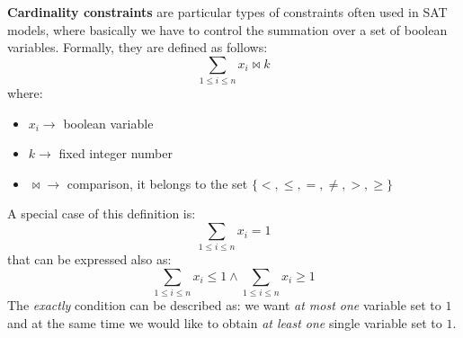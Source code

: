 \textbf{Cardinality constraints} are particular types of constraints often used in SAT models, where basically we have to control the summation over 
a set of boolean variables. Formally, they are defined as follows:
$$\sum_{1 \leq i \leq n} x_i \bowtie k$$
where:
\begin{itemize}
    \renewcommand{\labelitemi}{-}
    \item $x_i \rightarrow$ boolean variable
    \item $k \rightarrow$ fixed integer number
    \item $\bowtie \rightarrow$ comparison, it belongs to the set $\{<, \leq, =, \neq, >, \geq\}$ 
\end{itemize}
A special case of this definition is:
$$\sum_{1 \leq i \leq n} x_i = 1$$
that can be expressed also as:
$$\sum_{1 \leq i \leq n} x_i \leq 1 \wedge \sum_{1 \leq i \leq n} x_i \geq 1 $$
The \textit{exactly} condition can be described as: we want \textit{at most one} variable set to $1$ and at the same time we would like to obtain 
\textit{at least one} single variable set to $1$. \vspace{7pt}

